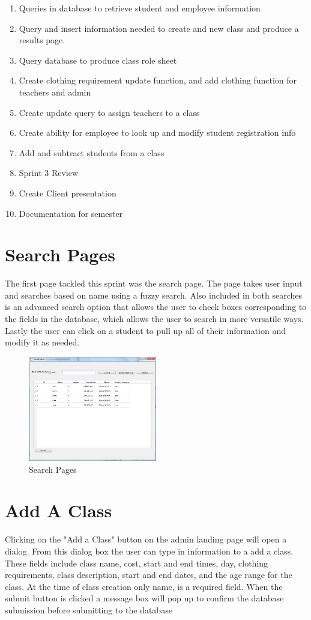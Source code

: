 \documentclass[11pt]{book}
\begin{document}
\begin{enumerate}
\item Queries in database to retrieve student and employee information
\item Query and insert information needed to create and new class and produce a results page.
\item Query database to produce class role sheet
\item Create clothing requirement update function, and add clothing function for teachers and admin
\item Create update query to assign teachers to a class
\item Create ability for employee to look up and modify student registration info
\item Add and subtract students from a class
\item Sprint 3 Review
\item Create Client presentation
\item Documentation for semester
\end{enumerate}

\section{Search Pages}
The first page tackled this sprint was the search page. The page takes user input and searches based on name using a fuzzy search. Also included in both searches is an advanced search option that allows the user to check boxes corresponding to the fields in the database, which allows the user to search in more versatile ways. Lastly the user can click on a student to pull up all of their information and modify it as needed.


\begin{figure}
\caption{Search Pages}
\centering
\includegraphics[width=0.5\textwidth]{search}
\end{figure}

\section{Add A Class}
Clicking on the "Add a Class" button on the admin landing page will open a dialog. From this dialog box the user can type in information to a add a class. These fields include class name, cost, start and end times, day, clothing requirements, class description, start and end dates, and the age range for the class.  At the time of class creation only name, is a required field. When the submit button is clicked a message box will pop up to confirm the database submission before submitting to the database  
\end{document}
